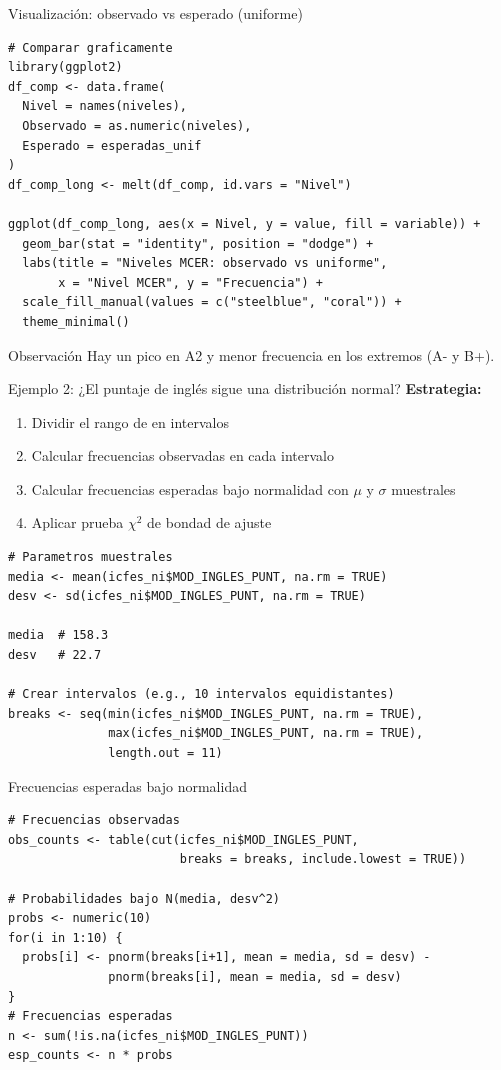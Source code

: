 \documentclass[aspectratio=169, 11pt]{beamer}
\begin{document}
\begin{frame}[fragile]{Visualización: observado vs esperado (uniforme)}
\begin{lstlisting}[basicstyle=\ttfamily\scriptsize]
# Comparar graficamente
library(ggplot2)
df_comp <- data.frame(
  Nivel = names(niveles),
  Observado = as.numeric(niveles),
  Esperado = esperadas_unif
)
df_comp_long <- melt(df_comp, id.vars = "Nivel")

ggplot(df_comp_long, aes(x = Nivel, y = value, fill = variable)) +
  geom_bar(stat = "identity", position = "dodge") +
  labs(title = "Niveles MCER: observado vs uniforme",
       x = "Nivel MCER", y = "Frecuencia") +
  scale_fill_manual(values = c("steelblue", "coral")) +
  theme_minimal()
\end{lstlisting}

\begin{block}{Observación}
Hay un pico en A2 y menor frecuencia en los extremos (A- y B+).
\end{block}
\end{frame}

\begin{frame}[fragile]{Ejemplo 2: ¿El puntaje de inglés sigue una distribución normal?}
\textbf{Estrategia:}
\begin{enumerate}
  \item Dividir el rango de  en intervalos
  \item Calcular frecuencias observadas en cada intervalo
  \item Calcular frecuencias esperadas bajo normalidad con $\mu$ y $\sigma$ muestrales
  \item Aplicar prueba $\chi^2$ de bondad de ajuste
\end{enumerate}

\vspace{0.1cm}
\begin{lstlisting}[basicstyle=\ttfamily\scriptsize]
# Parametros muestrales
media <- mean(icfes_ni$MOD_INGLES_PUNT, na.rm = TRUE)
desv <- sd(icfes_ni$MOD_INGLES_PUNT, na.rm = TRUE)

media  # 158.3
desv   # 22.7

# Crear intervalos (e.g., 10 intervalos equidistantes)
breaks <- seq(min(icfes_ni$MOD_INGLES_PUNT, na.rm = TRUE),
              max(icfes_ni$MOD_INGLES_PUNT, na.rm = TRUE),
              length.out = 11)
\end{lstlisting}
\end{frame}

\begin{frame}[fragile]{Frecuencias esperadas bajo normalidad}
\begin{lstlisting}
# Frecuencias observadas
obs_counts <- table(cut(icfes_ni$MOD_INGLES_PUNT,
                        breaks = breaks, include.lowest = TRUE))

# Probabilidades bajo N(media, desv^2)
probs <- numeric(10)
for(i in 1:10) {
  probs[i] <- pnorm(breaks[i+1], mean = media, sd = desv) -
              pnorm(breaks[i], mean = media, sd = desv)
}
# Frecuencias esperadas
n <- sum(!is.na(icfes_ni$MOD_INGLES_PUNT))
esp_counts <- n * probs
\end{lstlisting}
\end{frame}
\end{document}
